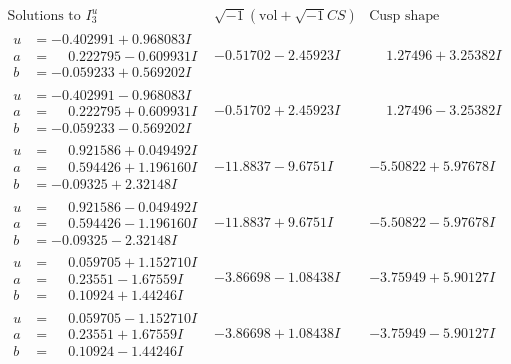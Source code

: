 \documentclass[1p]{elsarticle_modified}
\theoremstyle{definition}
\newcommand{\I}{\sqrt{-1}}
\begin{document}
$$\begin{array}{c|c|c}  
\text{Solutions to }I^u_{3}& \I (\text{vol} + \sqrt{-1}CS) & \text{Cusp shape}\\
 \hline 
\begin{aligned}
u &= -0.402991 + 0.968083 I \\
a &= \phantom{-}0.222795 - 0.609931 I \\
b &= -0.059233 + 0.569202 I\end{aligned}
 & -0.51702 - 2.45923 I & \phantom{-}1.27496 + 3.25382 I \\ \hline\begin{aligned}
u &= -0.402991 - 0.968083 I \\
a &= \phantom{-}0.222795 + 0.609931 I \\
b &= -0.059233 - 0.569202 I\end{aligned}
 & -0.51702 + 2.45923 I & \phantom{-}1.27496 - 3.25382 I \\ \hline\begin{aligned}
u &= \phantom{-}0.921586 + 0.049492 I \\
a &= \phantom{-}0.594426 + 1.196160 I \\
b &= -0.09325 + 2.32148 I\end{aligned}
 & -11.8837 - 9.6751 I & -5.50822 + 5.97678 I \\ \hline\begin{aligned}
u &= \phantom{-}0.921586 - 0.049492 I \\
a &= \phantom{-}0.594426 - 1.196160 I \\
b &= -0.09325 - 2.32148 I\end{aligned}
 & -11.8837 + 9.6751 I & -5.50822 - 5.97678 I \\ \hline\begin{aligned}
u &= \phantom{-}0.059705 + 1.152710 I \\
a &= \phantom{-}0.23551 - 1.67559 I \\
b &= \phantom{-}0.10924 + 1.44246 I\end{aligned}
 & -3.86698 - 1.08438 I & -3.75949 + 5.90127 I \\ \hline\begin{aligned}
u &= \phantom{-}0.059705 - 1.152710 I \\
a &= \phantom{-}0.23551 + 1.67559 I \\
b &= \phantom{-}0.10924 - 1.44246 I\end{aligned}
 & -3.86698 + 1.08438 I & -3.75949 - 5.90127 I \\ \hline\begin{aligned}

\end{aligned}
\end{array}$$
\end{document}
